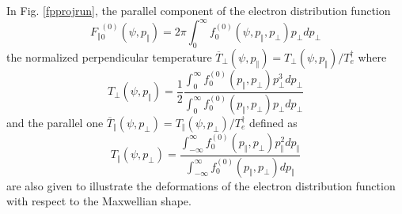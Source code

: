 In Fig. \ref{fpprojrun}, the parallel component of the electron distribution
function
\begin{equation}
F_{\Vert }{}_{0}^{\left( 0\right) }\left( \psi ,p_{\Vert }\right) =2\pi
\int_{0}^{\infty }f_{0}^{\left( 0\right) }\left( \psi ,p_{\Vert },p_{\bot
}\right) p_{\bot }dp_{\bot }  \label{Fpar}
\end{equation}
the normalized perpendicular temperature $\overline{T}_{\bot }\left( \psi
,p_{\Vert }\right) =T_{\bot }\left( \psi ,p_{\Vert }\right) /T_{e}^{\dag }$
where
\begin{equation}
T_{\bot }\left( \psi ,p_{\Vert }\right) =\frac{1}{2}\frac{\int_{0}^{\infty
}f_{0}^{\left( 0\right) }\left( p_{\Vert },p_{\bot }\right) p_{\bot
}^{3}dp_{\bot }}{\int_{0}^{\infty }f_{0}^{\left( 0\right) }\left( p_{\Vert
},p_{\bot }\right) p_{\bot }dp_{\bot }}  \label{Tperpnorm}
\end{equation}
and the parallel one $\overline{T}_{\Vert }\left( \psi ,p_{\bot }\right)
=T_{\Vert }\left( \psi ,p_{\bot }\right) /T_{e}^{\dag }$ defined as
\begin{equation}
T_{\Vert }\left( \psi ,p_{\bot }\right) =\frac{\int_{-\infty }^{\infty
}f_{0}^{\left( 0\right) }\left( p_{\Vert },p_{\bot }\right) p_{\Vert
}^{2}dp_{\Vert }}{\int_{-\infty }^{\infty }f_{0}^{\left( 0\right) }\left(
p_{\Vert },p_{\bot }\right) dp_{\Vert }}  \label{Tparnorm}
\end{equation}
are also given to illustrate the deformations of the electron distribution
function with respect to the Maxwellian shape.


